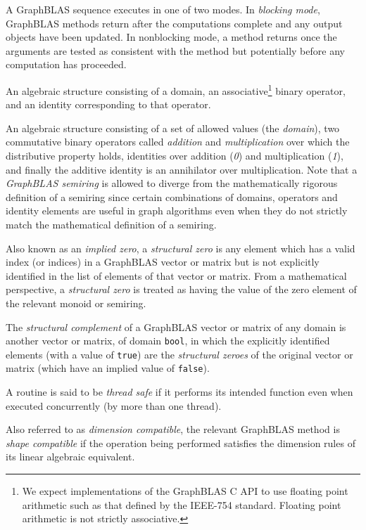  A GraphBLAS sequence executes in one of two modes.  
In \emph{blocking mode}, GraphBLAS methods return after the computations 
complete and any output objects have been updated.  In nonblocking mode, a 
method returns once the arguments are tested as consistent with 
the method but potentially before any computation has proceeded.

 An algebraic structure consisting of a domain, an 
associative\footnote{We expect implementations of the GraphBLAS C API
to use floating point arithmetic such as that defined by the IEEE-754 standard.
Floating point arithmetic is not strictly associative.}
binary operator, and an identity corresponding to that 
operator.

 An algebraic structure consisting of a set of allowed values
(the \emph{domain}), two commutative binary operators called \emph{addition} 
and \emph{multiplication} over which the distributive property holds, identities 
over addition (\emph{0}) and multiplication (\emph{1}), and finally the additive
identity is an annihilator over multiplication.   
Note that a \emph{GraphBLAS semiring} is allowed to diverge from the mathematically 
rigorous definition of a semiring since certain combinations of domains, operators and identity 
elements are useful in graph algorithms even when they do not strictly match the mathematical
definition of a semiring.

 Also known as an \emph{implied zero}, a \emph{structural zero} is any element which has a valid index (or indices) in a GraphBLAS vector or matrix but is not explicitly identified in the list of elements of that vector or matrix. From a mathematical perspective, a \emph{structural zero} is treated as having the value of the zero element of the relevant monoid or semiring.

 The \emph{structural complement} of a GraphBLAS vector or matrix of any domain is another vector or matrix, of domain {\tt bool}, in which the explicitly identified elements (with a value of {\tt true}) are the \emph{structural zeroes} of the original vector or matrix (which have an implied value of {\tt false}). 

 A routine is said to be \emph{thread safe} if it performs its intended 
function even when executed concurrently (by more than one thread).

 Also referred to as \emph{dimension compatible}, the relevant GraphBLAS method is \emph{shape compatible} if the operation being performed satisfies the dimension rules of its linear algebraic equivalent.

